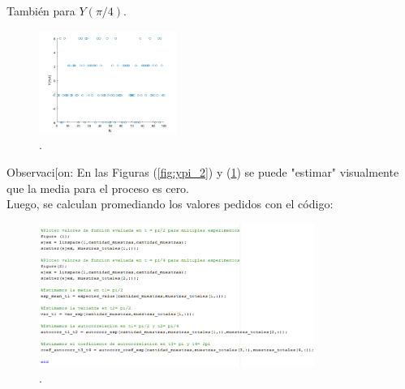 También para $Y(\pi/4)$.

\begin{figure}[H]
\centering
	\includegraphics[width=0.4\textwidth, trim = {0 0 0 0},clip]{./ImagenesEjercicio1/ypi_4.png}
	\caption{.}
	\label{fig:ypi_4}
\end{figure}

Observaci[on: En las Figuras (\ref{fig:ypi_2}) y (\ref{fig:ypi_4}) se puede "estimar" visualmente que la media para el proceso es cero. 
\\
Luego, se calculan promediando los valores pedidos con el código:

\begin{figure}[H]
\centering
	\includegraphics[width=0.8\textwidth, trim = {0 0 0 0},clip]{./ImagenesEjercicio1/main2.png}
	\caption{.}
	\label{fig:main2}
\end{figure}

